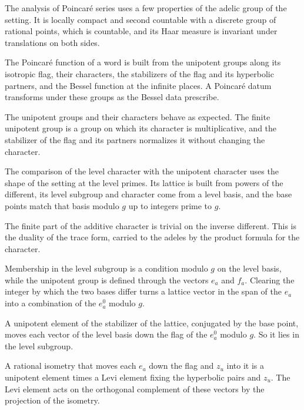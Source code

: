 The analysis of Poincaré series uses a few properties of the adelic group of the setting. It is locally
compact and second countable with a discrete group of rational points, which is countable, and its Haar
measure is invariant under translations on both sides.

The Poincaré function of a word is built from the unipotent groups along its isotropic flag, their
characters, the stabilizers of the flag and its hyperbolic partners, and the Bessel function at the
infinite places. A Poincaré datum transforms under these groups as the Bessel data prescribe.

The unipotent groups and their characters behave as expected. The finite unipotent group is a group on
which its character is multiplicative, and the stabilizer of the flag and its partners normalizes it
without changing the character.

The comparison of the level character with the unipotent character uses the shape of the setting at the
level primes. Its lattice is built from powers of the different, its level subgroup and character come
from a level basis, and the base points match that basis modulo $g$ up to integers prime to $g$.

The finite part of the additive character is trivial on the inverse different. This is the duality of the
trace form, carried to the adeles by the product formula for the character.

Membership in the level subgroup is a condition modulo $g$ on the level basis, while the unipotent group
is defined through the vectors $e_a$ and $f_a$. Clearing the integer by which the two bases differ turns a
lattice vector in the span of the $e_a$ into a combination of the $e^0_a$ modulo $g$.

A unipotent element of the stabilizer of the lattice, conjugated by the base point, moves each vector of
the level basis down the flag of the $e^0_a$ modulo $g$. So it lies in the level subgroup.

A rational isometry that moves each $e_a$ down the flag and $z_u$ into it is a unipotent element times a
Levi element fixing the hyperbolic pairs and $z_u$. The Levi element acts on the orthogonal complement of
these vectors by the projection of the isometry.

